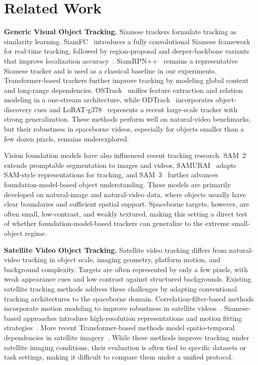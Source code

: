 \documentclass{article}
\begin{document}
\section{Related Work}

\noindent\textbf{Generic Visual Object Tracking.} Siamese trackers formulate tracking as similarity learning. SiamFC~\citep{bertinetto2016siamfc} introduces a fully convolutional Siamese framework for real-time tracking, followed by region-proposal and deeper-backbone variants that improve localization accuracy~\citep{li2018siamrpn,li2019siamrpn++}. SiamRPN++~\citep{li2019siamrpn++} remains a representative Siamese tracker and is used as a classical baseline in our experiments. Transformer-based trackers further improve tracking by modeling global context and long-range dependencies. OSTrack~\citep{ye2022joint} unifies feature extraction and relation modeling in a one-stream architecture, while ODTrack~\citep{zheng2024odtrack} incorporates object-discovery cues and LoRAT-g378~\citep{lin2024tracking} represents a recent large-scale tracker with strong generalization. These methods perform well on natural-video benchmarks, but their robustness in spaceborne videos, especially for objects smaller than a few dozen pixels, remains underexplored.

Vision foundation models have also influenced recent tracking research. SAM~2~\citep{ravi2024sam} extends promptable segmentation to images and videos, SAMURAI~\citep{yang2026samurai} adapts SAM-style representations for tracking, and SAM~3~\citep{carion2026sam3} further advances foundation-model-based object understanding. These models are primarily developed on natural-image and natural-video data, where objects usually have clear boundaries and sufficient spatial support. Spaceborne targets, however, are often small, low-contrast, and weakly textured, making this setting a direct test of whether foundation-model-based trackers can generalize to the extreme small-object regime.

\noindent\textbf{Satellite Video Object Tracking.} Satellite video tracking differs from natural-video tracking in object scale, imaging geometry, platform motion, and background complexity. Targets are often represented by only a few pixels, with weak appearance cues and low contrast against structured backgrounds. Existing satellite tracking methods address these challenges by adapting conventional tracking architectures to the spaceborne domain. Correlation-filter-based methods incorporate motion modeling to improve robustness in satellite videos~\citep{lin2024motion}. Siamese-based approaches introduce high-resolution representations and motion fitting strategies~\citep{ruan2022deep,shao2021hrsiam}. More recent Transformer-based methods model spatio-temporal dependencies in satellite imagery~\citep{lai2023target}. While these methods improve tracking under satellite imaging conditions, their evaluation is often tied to specific datasets or task settings, making it difficult to compare them under a unified protocol.
\end{document}
